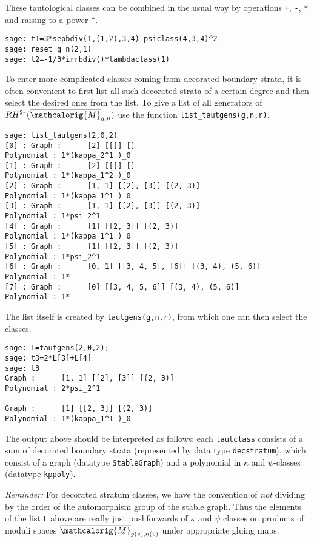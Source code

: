 \documentclass[11pt]{article}
\newcommand{\M}{\ensuremath{\overline{\mathcalorig{M}}}}
\begin{document}
These tautological classes can be combined in the usual way by operations \verb|+|, \verb|-|, \verb|*| and raising to a power \verb|^|.
\begin{lstlisting}
sage: t1=3*sepbdiv(1,(1,2),3,4)-psiclass(4,3,4)^2
sage: reset_g_n(2,1)
sage: t2=-1/3*irrbdiv()*lambdaclass(1)
\end{lstlisting}
To enter more complicated classes coming from decorated boundary strata, it is often convenient to first list all such decorated strata of a certain degree and then select the desired ones from the list. To give a list of all generators of $RH^{2r}(\M_{g,n})$ use the function \verb|list_tautgens(g,n,r)|.
\begin{lstlisting}
sage: list_tautgens(2,0,2)
[0] : Graph :      [2] [[]] []
Polynomial : 1*(kappa_2^1 )_0
[1] : Graph :      [2] [[]] []
Polynomial : 1*(kappa_1^2 )_0
[2] : Graph :      [1, 1] [[2], [3]] [(2, 3)]
Polynomial : 1*(kappa_1^1 )_0
[3] : Graph :      [1, 1] [[2], [3]] [(2, 3)]
Polynomial : 1*psi_2^1
[4] : Graph :      [1] [[2, 3]] [(2, 3)]
Polynomial : 1*(kappa_1^1 )_0
[5] : Graph :      [1] [[2, 3]] [(2, 3)]
Polynomial : 1*psi_2^1
[6] : Graph :      [0, 1] [[3, 4, 5], [6]] [(3, 4), (5, 6)]
Polynomial : 1*
[7] : Graph :      [0] [[3, 4, 5, 6]] [(3, 4), (5, 6)]
Polynomial : 1*
\end{lstlisting}
The list itself is created by \verb|tautgens(g,n,r)|, from which one can then select the classes.
\begin{lstlisting}
sage: L=tautgens(2,0,2);
sage: t3=2*L[3]+L[4]
sage: t3
Graph :      [1, 1] [[2], [3]] [(2, 3)]
Polynomial : 2*psi_2^1

Graph :      [1] [[2, 3]] [(2, 3)]
Polynomial : 1*(kappa_1^1 )_0
\end{lstlisting}
The output above should be interpreted as follows: each \verb|tautclass| consists of a sum of decorated boundary strata (represented by data type \verb|decstratum|), which consist of a graph (datatype \verb|StableGraph|) and a polynomial in $\kappa$ and $\psi$-classes (datatype \verb|kppoly|).

\emph{Reminder:} For decorated stratum classes, we have the convention of \emph{not} dividing by the order of the automorphism group of the stable graph. Thus the elements of the list \verb|L| above are really just pushforwards of $\kappa$ and $\psi$ classes on products of moduli spaces $\M_{g(v),n(v)}$ under appropriate gluing maps.
\end{document}
